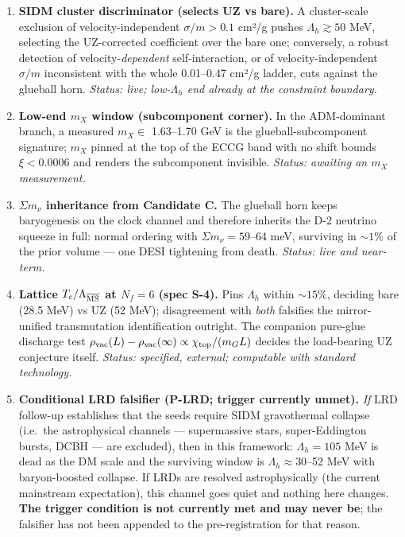 \documentclass[preprint,12pt]{elsarticle}
\providecommand{\tightlist}{\setlength{\itemsep}{0pt}\setlength{\parskip}{0pt}}
\begin{document}
\begin{enumerate}
\def\labelenumi{\arabic{enumi}.}
\tightlist
\item
  \textbf{SIDM cluster discriminator (selects UZ vs bare).} A
  cluster-scale exclusion of velocity-independent \(\sigma/m > 0.1\)
  cm²/g pushes \(\Lambda_h \gtrsim 50\) MeV, selecting the UZ-corrected
  coefficient over the bare one; conversely, a robust detection of
  velocity-\emph{dependent} self-interaction, or of velocity-independent
  \(\sigma/m\) inconsistent with the whole 0.01--0.47 cm²/g ladder, cuts
  against the glueball horn. \emph{Status: live; low-\(\Lambda_h\) end
  already at the constraint boundary.}
\item
  \textbf{Low-end \(m_X\) window (subcomponent corner).} In the
  ADM-dominant branch, a measured \(m_X \in\) 1.63--1.70 GeV is the
  glueball-subcomponent signature; \(m_X\) pinned at the top of the ECCG
  band with no shift bounds \(\xi < 0.0006\) and renders the
  subcomponent invisible. \emph{Status: awaiting an \(m_X\)
  measurement.}
\item
  \textbf{\(\Sigma m_\nu\) inheritance from Candidate C.} The glueball
  horn keeps baryogenesis on the clock channel and therefore inherits
  the D-2 neutrino squeeze in full: normal ordering with
  \(\Sigma m_\nu = 59\)--64 meV, surviving in \(\sim 1\%\) of the prior
  volume --- one DESI tightening from death. \emph{Status: live and
  near-term.}
\item
  \textbf{Lattice \(T_c/\Lambda_{\overline{\rm MS}}\) at \(N_f = 6\)
  (spec S-4).} Pins \(\Lambda_h\) within \(\sim 15\%\), deciding bare
  (28.5 MeV) vs UZ (52 MeV); disagreement with \emph{both} falsifies the
  mirror-unified transmutation identification outright. The companion
  pure-glue discharge test
  \(\rho_{\rm vac}(L) - \rho_{\rm vac}(\infty) \propto \chi_{\rm top}/(m_G L)\)
  decides the load-bearing UZ conjecture itself. \emph{Status:
  specified, external; computable with standard technology.}
\item
  \textbf{Conditional LRD falsifier (P-LRD; trigger currently unmet).}
  \emph{If} LRD follow-up establishes that the seeds require SIDM
  gravothermal collapse (i.e.~the astrophysical channels ---
  supermassive stars, super-Eddington bursts, DCBH --- are excluded),
  then in this framework: \(\Lambda_h = 105\) MeV is dead as the DM
  scale and the surviving window is \(\Lambda_h \approx 30\)--52 MeV
  with baryon-boosted collapse. If LRDs are resolved astrophysically
  (the current mainstream expectation), this channel goes quiet and
  nothing here changes. \textbf{The trigger condition is not currently
  met and may never be}; the falsifier has not been appended to the
  pre-registration for that reason.
\end{enumerate}
\end{document}
